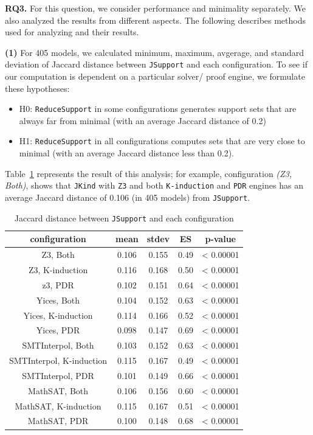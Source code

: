 \textbf{RQ3.}   For this question, we consider performance and minimality separately.  We also analyzed the results from different aspects. The following describes methods used for analyzing and their results.

\textbf{(1)} For 405 models, we calculated minimum, maximum, avgerage, and standard deviation of Jaccard distance between \texttt{JSupport} and each configuration. To see if our computation is dependent on a particular solver/ proof engine, we formulate these hypotheses:
\begin{itemize}
  \item H0: \texttt{ReduceSupport} in some configurations generates support sets that are always far from minimal (with an average Jaccard distance of 0.2)
  \item H1: \texttt{ReduceSupport} in all configurations computes sets that are very close to minimal (with an average Jaccard distance less than 0.2).
\end{itemize}

Table~\ref{tab:jsupconf} represents the result of this analysis; for example, configuration \emph{(Z3, Both)}, shows that \texttt{JKind} with \texttt{Z3} and both \texttt{K-induction} and \texttt{PDR} engines has an average Jaccard distance of 0.106 (in 405 models) from \texttt{JSupport}.


\begin{table}
  \centering
  \begin{tabular}{|c|c|c|c|c|}
    \hline
    configuration & mean & stdev & ES & p-value \\[0.5ex]
    \hline\hline
    Z3, Both  & 0.106 & 0.155 & 0.49 & < 0.00001\\[0.5ex] %
    Z3, K-induction & 0.116 & 0.168 & 0.50 & < 0.00001\\[0.5ex]
    z3, PDR  & 0.102 & 0.151 & 0.64 & < 0.00001\\[0.5ex]
    \hline
    Yices, Both & 0.104 & 0.152 & 0.63& < 0.00001 \\[0.5ex]
    Yices, K-induction  & 0.114 & 0.166 & 0.52 & < 0.00001 \\[0.5ex]
    Yices, PDR  & 0.098 & 0.147 & 0.69 & < 0.00001\\[0.5ex]
    \hline
    SMTInterpol, Both  & 0.103 & 0.152 & 0.63 & < 0.00001\\[0.5ex]
    SMTInterpol, K-induction  & 0.115 & 0.167 & 0.49 & < 0.00001\\[0.5ex]
    SMTInterpol, PDR  & 0.101 & 0.149 & 0.66 & < 0.00001\\[0.5ex]
    \hline
    MathSAT, Both  & 0.106 & 0.156 & 0.60 & < 0.00001\\[0.5ex]
    MathSAT, K-induction & 0.115 & 0.167 &0.51 & < 0.00001\\[0.5ex]
    MathSAT, PDR & 0.100 & 0.148 & 0.68  &< 0.00001\\[0.5ex]
    \hline
  \end{tabular}
  \caption{Jaccard distance between \texttt{JSupport} and each configuration}\label{tab:jsupconf}
\end{table}

